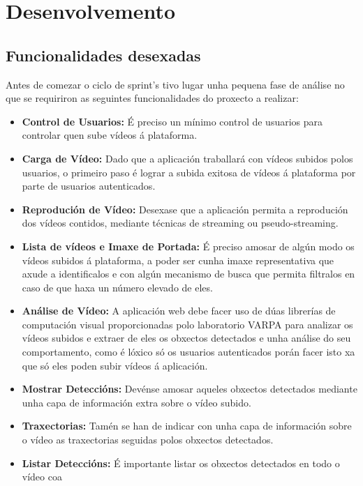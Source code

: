 \chapter{Desenvolvemento}
\label{cap:desenvolvemento}

\section{Funcionalidades desexadas}
    Antes de comezar o ciclo de sprint's tivo lugar unha pequena fase de análise no que se 
    requiriron as seguintes funcionalidades do proxecto a realizar:
    \begin{itemize}
     \item \textbf{Control de Usuarios:} É preciso un mínimo control de usuarios para controlar quen
        sube vídeos á plataforma.
     \item \textbf{Carga de Vídeo:} Dado que a aplicación traballará con vídeos subidos polos 
        usuarios, o primeiro paso é lograr a subida exitosa de vídeos á plataforma por parte de
        usuarios autenticados.
     \item \textbf{Reprodución de Vídeo:} Desexase que a aplicación permita a reprodución dos vídeos
        contidos, mediante técnicas de streaming ou pseudo-streaming.
     \item \textbf{Lista de vídeos e Imaxe de Portada:} É preciso amosar de algún modo os vídeos 
        subidos á plataforma, a poder ser cunha imaxe representativa que axude a identificalos e con
        algún mecanismo de busca que permita filtralos en caso de que haxa un número elevado de eles.
     \item \textbf{Análise de Vídeo:} A aplicación web debe facer uso de dúas librerías de 
        computación visual proporcionadas polo laboratorio VARPA para analizar os vídeos subidos e
        extraer de eles os obxectos detectados e unha análise do seu comportamento, como é lóxico só
        os usuarios autenticados porán facer isto xa que só eles poden subir vídeos á aplicación.
     \item \textbf{Mostrar Deteccións:} Devénse amosar aqueles obxectos detectados mediante unha 
        capa de información extra sobre o vídeo subido. 
     \item \textbf{Traxectorias:} Tamén se han de indicar con unha capa de información sobre o vídeo
        as traxectorias seguidas polos obxectos detectados.
     \item \textbf{Listar Deteccións:} É importante listar os obxectos detectados en todo o vídeo coa

\end{itemize}
